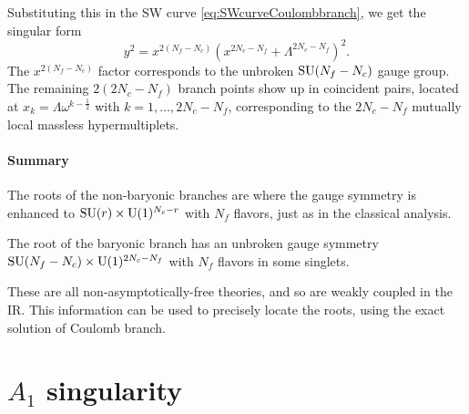         Substituting this in the SW curve \eqref{eq:SWcurveCoulombbranch}, we get the singular form
        \begin{equation}
            y^2=x^{2(N_f-N_c)}(x^{2N_c-N_f}+\Lambda^{2N_c-N_f})^2.
        \end{equation}
        The $x^{2(N_f-N_c)}$ factor corresponds to the unbroken $\text{SU}(N_f-N_c)$ gauge group. The remaining $2(2N_c-N_f)$ branch points show up in coincident pairs, located at $x_k=\Lambda\omega^{k-\frac{1}{2}}$ with $k=1,\dots,2N_c-N_f$, corresponding to the $2N_c-N_f$ mutually local massless hypermultiplets.

    \subsection{Summary}

        The roots of the non-baryonic branches are where the gauge symmetry is enhanced to $\text{SU}(r)\times\text{U}(1)^{N_c-r}$ with $N_f$ flavors, just as in the classical analysis.

        The root of the baryonic branch has an unbroken gauge symmetry $\text{SU}(N_f-N_c)\times\text{U}(1)^{2N_c-N_f}$ with $N_f$ flavors in some singlets.

        These are all non-asymptotically-free theories, and so are weakly coupled in the IR. This information can be used to precisely locate the roots, using the exact solution of Coulomb branch.


\part{$A_1$ singularity}

